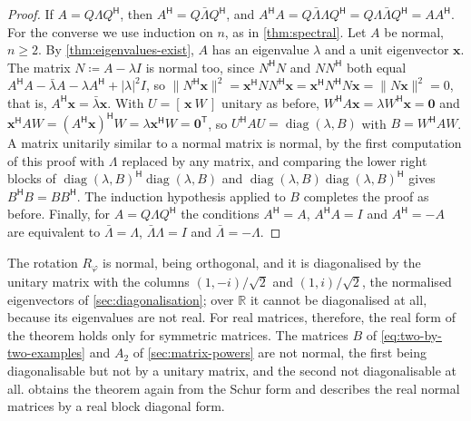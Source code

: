 \begin{proof}
If $A=Q\Lambda Q^{\mathsf H}$, then $A^{\mathsf H}=Q\bar\Lambda Q^{\mathsf H}$, and $A^{\mathsf H}A=Q\bar\Lambda\Lambda Q^{\mathsf H}=Q\Lambda\bar\Lambda Q^{\mathsf H}=AA^{\mathsf H}$. For the converse we use induction on $n$, as in \cref{thm:spectral}. Let $A$ be normal, $n\ge2$. By \cref{thm:eigenvalues-exist}, $A$ has an eigenvalue $\lambda$ and a unit eigenvector $\mathbf x$. The matrix $N\coloneqq A-\lambda I$ is normal too, since $N^{\mathsf H}N$ and $NN^{\mathsf H}$ both equal $A^{\mathsf H}A-\bar\lambda A-\lambda A^{\mathsf H}+|\lambda|^2I$, so $\|N^{\mathsf H}\mathbf x\|^2=\mathbf x^{\mathsf H}NN^{\mathsf H}\mathbf x=\mathbf x^{\mathsf H}N^{\mathsf H}N\mathbf x=\|N\mathbf x\|^2=0$, that is, $A^{\mathsf H}\mathbf x=\bar\lambda\mathbf x$. With $U=[\,\mathbf x\ W\,]$ unitary as before, $W^{\mathsf H}A\mathbf x=\lambda W^{\mathsf H}\mathbf x=\mathbf 0$ and $\mathbf x^{\mathsf H}AW=(A^{\mathsf H}\mathbf x)^{\mathsf H}W=\lambda\mathbf x^{\mathsf H}W=\mathbf 0^{\mathsf T}$, so $U^{\mathsf H}AU=\operatorname{diag}(\lambda,B)$ with $B=W^{\mathsf H}AW$. A matrix unitarily similar to a normal matrix is normal, by the first computation of this proof with $\Lambda$ replaced by any matrix, and comparing the lower right blocks of $\operatorname{diag}(\lambda,B)^{\mathsf H}\operatorname{diag}(\lambda,B)$ and $\operatorname{diag}(\lambda,B)\operatorname{diag}(\lambda,B)^{\mathsf H}$ gives $B^{\mathsf H}B=BB^{\mathsf H}$. The induction hypothesis applied to $B$ completes the proof as before. Finally, for $A=Q\Lambda Q^{\mathsf H}$ the conditions $A^{\mathsf H}=A$, $A^{\mathsf H}A=I$ and $A^{\mathsf H}=-A$ are equivalent to $\bar\Lambda=\Lambda$, $\bar\Lambda\Lambda=I$ and $\bar\Lambda=-\Lambda$.
\end{proof}

The rotation $R_\varphi$ is normal, being orthogonal, and it is diagonalised by the unitary matrix with the columns $(1,-i)/\sqrt2$ and $(1,i)/\sqrt2$, the normalised eigenvectors of \cref{sec:diagonalisation}; over $\mathbb R$ it cannot be diagonalised at all, because its eigenvalues are not real. For real matrices, therefore, the real form of the theorem holds only for symmetric matrices. The matrices $B$ of \eqref{eq:two-by-two-examples} and $A_2$ of \cref{sec:matrix-powers} are not normal, the first being diagonalisable but not by a unitary matrix, and the second not diagonalisable at all.  obtains the theorem again from the Schur form and describes the real normal matrices by a real block diagonal form.

